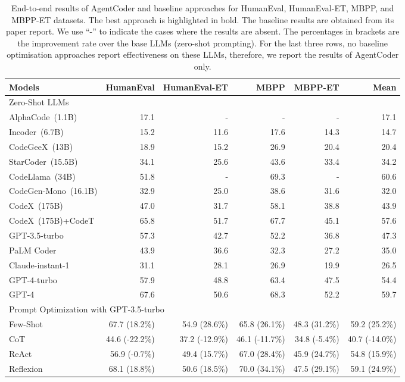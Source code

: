 \documentclass[manuscript,screen,review]{acmart}
\newcommand{\xxx}{AgentCoder\xspace}
\begin{document}
\begin{table}[h!]
    \centering
    \caption{End-to-end results of \xxx and baseline approaches for HumanEval, HumanEval-ET, MBPP, and MBPP-ET datasets. The best approach is highlighted in bold. The baseline results are obtained from its paper report. 
    We use ``-'' to indicate the cases where the results are absent. The percentages in brackets are the improvement rate over the base LLMs (zero-shot prompting). For the last three rows, no baseline optimisation approaches report effectiveness on these LLMs, therefore, we report the results of \xxx only. }
    \begin{tabular}{l|rrrr|r}
    \toprule
    Models&\textbf{HumanEval}&\textbf{HumanEval-ET}&\textbf{MBPP}&\textbf{MBPP-ET}&\textbf{Mean}\\
    \midrule
    \multicolumn{6}{l}{Zero-Shot LLMs}\\
    \midrule
    AlphaCode~(1.1B)&17.1&-&-&-&17.1  \\
    Incoder~(6.7B)&15.2&11.6&17.6&14.3&14.7 \\
    CodeGeeX~(13B)&18.9&15.2&26.9&20.4&20.4\\
    StarCoder~(15.5B)&34.1&25.6&43.6&33.4&34.2\\
    CodeLlama~(34B)&51.8&-&69.3&-&60.6\\
    CodeGen-Mono~(16.1B)&32.9&25.0&38.6&31.6&32.0\\
    CodeX~(175B)&47.0&31.7&58.1&38.8&43.9\\
    CodeX~(175B)+CodeT&65.8&51.7&67.7&45.1&57.6\\
    GPT-3.5-turbo&57.3&42.7&52.2&36.8&47.3\\
    PaLM Coder&43.9&36.6&32.3&27.2&35.0\\
    Claude-instant-1&31.1&28.1&26.9&19.9&26.5\\
    GPT-4-turbo&57.9&48.8&63.4&47.5&54.4\\
    GPT-4&67.6&50.6&68.3&52.2&59.7\\
     \midrule
     \multicolumn{6}{l}{Prompt Optimization with GPT-3.5-turbo}\\
     \midrule
Few-Shot& 67.7 (18.2\%)&54.9 (28.6\%)&65.8 (26.1\%)&48.3 (31.2\%)&59.2 (25.2\%)\\
CoT& 44.6 (-22.2\%)&37.2 (-12.9\%)&46.1 (-11.7\%)&34.8 (-5.4\%)&40.7 (-14.0\%)\\
ReAct& 56.9 (-0.7\%)&49.4 (15.7\%)&67.0 (28.4\%)&45.9 (24.7\%)&54.8 (15.9\%)\\
Reflexion& 68.1 (18.8\%)&50.6 (18.5\%)&70.0 (34.1\%)&47.5 (29.1\%)&59.1 (24.9\%)\\

\end{tabular}
\end{table}
\end{document}
